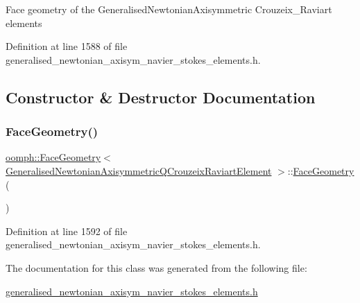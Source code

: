 Face geometry of the Generalised\+Newtonian\+Axisymmetric Crouzeix\+\_\+\+Raviart elements 

Definition at line 1588 of file generalised\+\_\+newtonian\+\_\+axisym\+\_\+navier\+\_\+stokes\+\_\+elements.\+h.



\subsection{Constructor \& Destructor Documentation}
\mbox{\label{classoomph_1_1FaceGeometry_3_01GeneralisedNewtonianAxisymmetricQCrouzeixRaviartElement_01_4_aa0cf7d24b41dc1e0036602fb703b4e1b}} 
\subsubsection{\texorpdfstring{Face\+Geometry()}{FaceGeometry()}}
{\footnotesize\ttfamily \hyperlink{classoomph_1_1FaceGeometry}{oomph\+::\+Face\+Geometry}$<$ \hyperlink{classoomph_1_1GeneralisedNewtonianAxisymmetricQCrouzeixRaviartElement}{Generalised\+Newtonian\+Axisymmetric\+Q\+Crouzeix\+Raviart\+Element} $>$\+::\hyperlink{classoomph_1_1FaceGeometry}{Face\+Geometry} (\begin{DoxyParamCaption}{ }\end{DoxyParamCaption})\hspace{0.3cm}{\ttfamily [inline]}}



Definition at line 1592 of file generalised\+\_\+newtonian\+\_\+axisym\+\_\+navier\+\_\+stokes\+\_\+elements.\+h.



The documentation for this class was generated from the following file\+:\begin{DoxyCompactItemize}
\item 
\hyperlink{generalised__newtonian__axisym__navier__stokes__elements_8h}{generalised\+\_\+newtonian\+\_\+axisym\+\_\+navier\+\_\+stokes\+\_\+elements.\+h}\end{DoxyCompactItemize}
